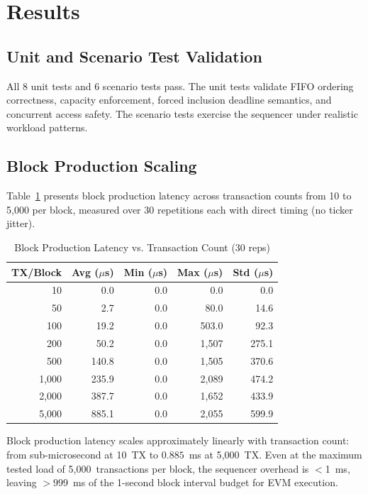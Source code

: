 
\section{Results}

\subsection{Unit and Scenario Test Validation}

All 8 unit tests and 6 scenario tests pass. The unit tests validate FIFO ordering
correctness, capacity enforcement, forced inclusion deadline semantics, and concurrent
access safety. The scenario tests exercise the sequencer under realistic workload
patterns.

\subsection{Block Production Scaling}

Table~\ref{tab:block-scaling} presents block production latency across transaction
counts from 10 to 5{,}000 per block, measured over 30 repetitions each with direct
timing (no ticker jitter).

\begin{table}[htbp]
\caption{Block Production Latency vs. Transaction Count (30 reps)}
\label{tab:block-scaling}
\centering
\begin{tabular}{rrrrr}
\toprule
\textbf{TX/Block} & \textbf{Avg ($\mu$s)} & \textbf{Min ($\mu$s)} & \textbf{Max ($\mu$s)} & \textbf{Std ($\mu$s)} \\
\midrule
10 & 0.0 & 0.0 & 0.0 & 0.0 \\
50 & 2.7 & 0.0 & 80.0 & 14.6 \\
100 & 19.2 & 0.0 & 503.0 & 92.3 \\
200 & 50.2 & 0.0 & 1{,}507 & 275.1 \\
500 & 140.8 & 0.0 & 1{,}505 & 370.6 \\
1{,}000 & 235.9 & 0.0 & 2{,}089 & 474.2 \\
2{,}000 & 387.7 & 0.0 & 1{,}652 & 433.9 \\
5{,}000 & 885.1 & 0.0 & 2{,}055 & 599.9 \\
\bottomrule
\end{tabular}
\end{table}

Block production latency scales approximately linearly with transaction count: from
sub-microsecond at 10~TX to $0.885$~ms at 5{,}000~TX. Even at the maximum tested
load of 5{,}000~transactions per block, the sequencer overhead is $<$1~ms,
leaving $>$999~ms of the 1-second block interval budget for EVM execution.

